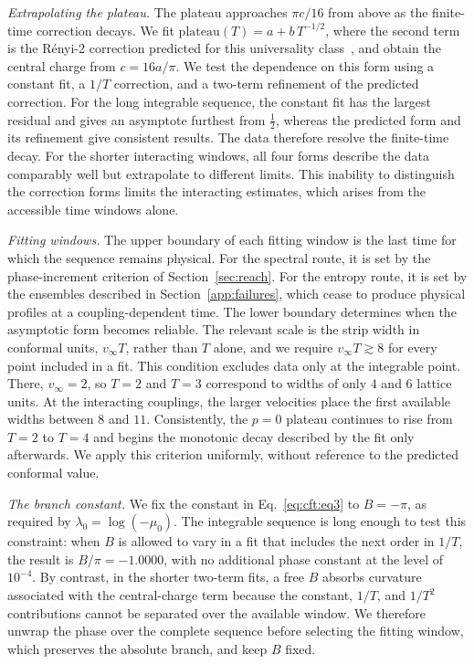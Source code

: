 \textit{Extrapolating the plateau.} The plateau approaches $\pi c/16$ from above as the finite-time correction decays. We fit
$\mathrm{plateau}(T)=a+b\,T^{-1/2}$, where the second term is the R\'enyi-2 correction predicted for this universality class~\cite{boucomas2026}, and obtain the central charge from $c=16a/\pi$. We test the dependence on this form using a constant fit, a $1/T$ correction, and a two-term refinement of the predicted correction. For the long integrable sequence, the constant fit has the largest residual and gives an asymptote furthest from $\tfrac12$, whereas the predicted form and its refinement give consistent results. The data therefore resolve the finite-time decay. For the shorter interacting windows, all four forms describe the data comparably well but extrapolate to different limits. This inability to distinguish the correction forms limits the interacting estimates, which arises from the accessible time windows alone.

\textit{Fitting windows.} The upper boundary of each fitting window is the last time for which the sequence remains physical. For the spectral route, it is set by the phase-increment criterion of Section~\ref{sec:reach}. For the entropy route, it is set by the ensembles described in Section~\ref{app:failures}, which cease to produce physical profiles at a coupling-dependent time. The lower boundary determines when the asymptotic form becomes reliable. The relevant scale is the strip width in conformal units, $v_\infty T$, rather than $T$ alone, and we require $v_\infty T\gtrsim8$ for every point included in a fit. This condition excludes data only at the integrable point. There, $v_\infty=2$, so $T=2$ and $T=3$ correspond to widths of only $4$ and $6$ lattice units. At the interacting couplings, the larger velocities place the first available widths between $8$ and $11$. Consistently, the $p=0$ plateau continues to rise from $T=2$ to $T=4$ and begins the monotonic decay described by the fit only afterwards. We apply this criterion uniformly, without reference to the predicted conformal value.

\textit{The branch constant.} We fix the constant in Eq.~\eqref{eq:cft:eq3} to $B=-\pi$, as required by $\lambda_0=\log(-\mu_0)$. The integrable sequence is long enough to test this constraint: when $B$ is allowed to vary in a fit that includes the next order in $1/T$, the result is $B/\pi=-1.0000$, with no additional phase constant at the level of $10^{-4}$. By contrast, in the shorter two-term fits, a free $B$ absorbs curvature associated with the central-charge term because the constant, $1/T$, and $1/T^2$ contributions cannot be separated over the available window. We therefore unwrap the phase over the complete sequence before selecting the fitting window, which preserves the absolute branch, and keep $B$ fixed.

